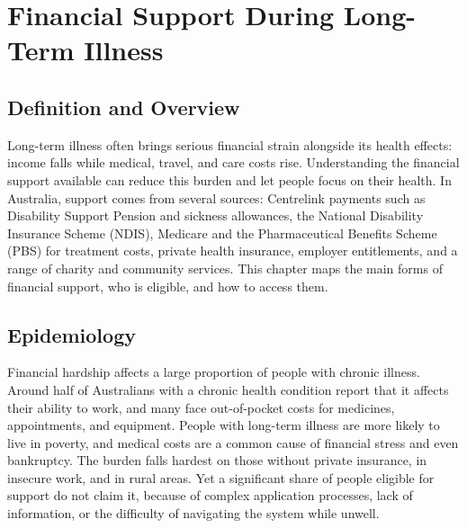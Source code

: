 \chapter{Financial Support During Long-Term Illness}

\section*{Definition and Overview}
Long-term illness often brings serious financial strain alongside its health effects: income falls while medical, travel, and care costs rise. Understanding the financial support available can reduce this burden and let people focus on their health. In Australia, support comes from several sources: Centrelink payments such as Disability Support Pension and sickness allowances, the National Disability Insurance Scheme (NDIS), Medicare and the Pharmaceutical Benefits Scheme (PBS) for treatment costs, private health insurance, employer entitlements, and a range of charity and community services. This chapter maps the main forms of financial support, who is eligible, and how to access them.

\section*{Epidemiology}
Financial hardship affects a large proportion of people with chronic illness. Around half of Australians with a chronic health condition report that it affects their ability to work, and many face out-of-pocket costs for medicines, appointments, and equipment. People with long-term illness are more likely to live in poverty, and medical costs are a common cause of financial stress and even bankruptcy. The burden falls hardest on those without private insurance, in insecure work, and in rural areas. Yet a significant share of people eligible for support do not claim it, because of complex application processes, lack of information, or the difficulty of navigating the system while unwell.

